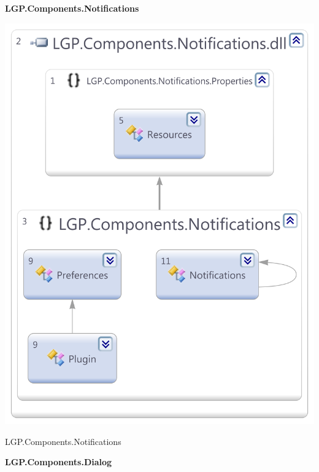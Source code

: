 			
	\begin{multicols}{2}	

		\large{\bfseries{LGP.Components.Notifications}}
		\vspace{5mm}
		
			\begin{figurehere}
				\centering
				\includegraphics[scale=0.30]{pages/appendix3/figures/dllscreens/notifications.png}
				\caption{LGP.Components.Notifications}
			\end{figurehere}
	
	
		\large{\bfseries{LGP.Components.Dialog}}
		\vspace{5mm}
		

\end{multicols}
